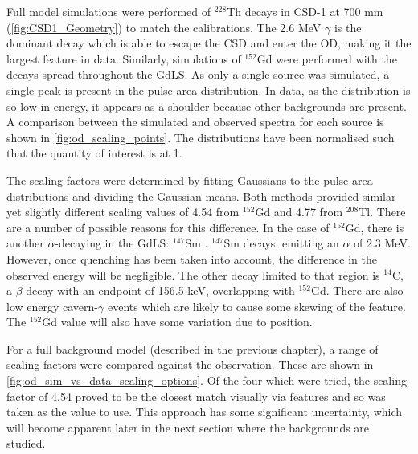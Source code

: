 \par
Full model simulations were performed of ${}^{228}$Th decays in CSD-1 at 700 mm (\autoref{fig:CSD1_Geometry}) to match the calibrations.
The 2.6 MeV $\gamma$ is the dominant decay which is able to escape the CSD and enter the OD, making it the largest feature in data.
Similarly, simulations of ${}^{152}$Gd were performed with the decays spread throughout the GdLS.
As only a single source was simulated, a single peak is present in the pulse area distribution.
In data, as the distribution is so low in energy, it appears as a shoulder because other backgrounds are present.
A comparison between the simulated and observed spectra for each source is shown in \autoref{fig:od_scaling_points}.
The distributions have been normalised such that the quantity of interest is at 1.

\par
The scaling factors were determined by fitting Gaussians to the pulse area distributions and dividing the Gaussian means.
Both methods provided similar yet slightly different scaling values of 4.54 from ${}^{152}$Gd and 4.77 from ${}^{208}$Tl.
There are a number of possible reasons for this difference.
In the case of ${}^{152}$Gd, there is another $\alpha$-decaying in the GdLS: ${}^{147}$Sm \cite{scotthaselschwardt_thesis_ref}.
${}^{147}$Sm decays, emitting an $\alpha$ of 2.3 MeV. 
However, once quenching has been taken into account, the difference in the observed energy will be negligible.
The other decay limited to that region is ${}^{14}$C, a $\beta$ decay with an endpoint of 156.5 keV, overlapping with ${}^{152}$Gd.
There are also low energy cavern-$\gamma$ events which are likely to cause some skewing of the feature.
The ${}^{152}$Gd value will also have some variation due to position.

\par
For a full background model (described in the previous chapter), a range of scaling factors were compared against the observation.
These are shown in \autoref{fig:od_sim_vs_data_scaling_options}.
Of the four which were tried, the scaling factor of 4.54 proved to be the closest match visually via features and so was taken as the value to use.
This approach has some significant uncertainty, which will become apparent later in the next section where the backgrounds are studied.






